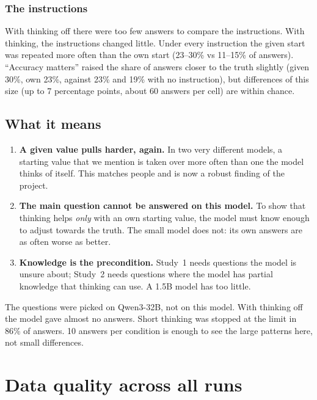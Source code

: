 \documentclass[11pt,a4paper]{article}
\begin{document}
\subsubsection{The instructions}
With thinking off there were too few answers to compare the instructions. With thinking, the instructions changed little. Under every instruction the given start was repeated more often than the own start (23--30\% vs 11--15\% of answers). \enquote{Accuracy matters} raised the share of answers closer to the truth slightly (given 30\%, own 23\%, against 23\% and 19\% with no instruction), but differences of this size (up to 7 percentage points, about 60 answers per cell) are within chance.

\subsection{What it means}

\begin{enumerate}[leftmargin=*]
  \item \textbf{A given value pulls harder, again.} In two very different models, a starting value that we mention is taken over more often than one the model thinks of itself. This matches people \citep{epley2001putting} and is now a robust finding of the project.
  \item \textbf{The main question cannot be answered on this model.} To show that thinking helps \emph{only} with an own starting value, the model must know enough to adjust towards the truth. The small model does not: its own answers are as often worse as better.
  \item \textbf{Knowledge is the precondition.} Study~1 needs questions the model is unsure about; Study~2 needs questions where the model has partial knowledge that thinking can use. A 1.5B model has too little.
\end{enumerate}

\begin{cautionbox}[Limits.]
The questions were picked on Qwen3-32B, not on this model. With thinking off the model gave almost no answers. Short thinking was stopped at the limit in 86\% of answers. 10 answers per condition is enough to see the large patterns here, not small differences.
\end{cautionbox}

\section{Data quality across all runs}
\end{document}
